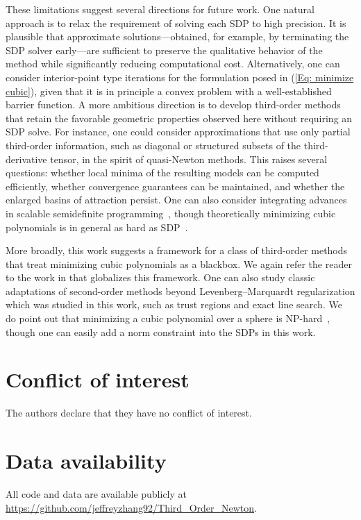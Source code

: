 \documentclass[11pt]{article}
\theoremstyle{plain}
\theoremstyle{definition}
\theoremstyle{remark}
\begin{document}
These limitations suggest several directions for future work. One natural approach is to relax the requirement of solving each SDP to high precision. It is plausible that approximate solutions—obtained, for example, by terminating the SDP solver early—are sufficient to preserve the qualitative behavior of the method while significantly reducing computational cost. Alternatively, one can consider interior-point type iterations for the formulation posed in (\ref{Eq: minimize cubic}), given that it is in principle a convex problem with a well-established barrier function. A more ambitious direction is to develop third-order methods that retain the favorable geometric properties observed here without requiring an SDP solve. For instance, one could consider approximations that use only partial third-order information, such as diagonal or structured subsets of the third-derivative tensor, in the spirit of quasi-Newton methods. This raises several questions: whether local minima of the resulting models can be computed efficiently, whether convergence guarantees can be maintained, and whether the enlarged basins of attraction persist. One can also consider integrating advances in scalable semidefinite programming~\cite{majumdar2020recent}, though theoretically minimizing cubic polynomials is in general as hard as SDP~\cite{ahmadi2022complexity}.

More broadly, this work suggests a framework for a class of third-order methods that treat minimizing cubic polynomials as a blackbox. We again refer the reader to the work in \cite{cai2026globally} that globalizes this framework. One can also study classic adaptations of second-order methods beyond Levenberg–Marquardt regularization which was studied in this work, such as trust regions and exact line search. We do point out that minimizing a cubic polynomial over a sphere is NP-hard~\cite{nesterov2003random}, though one can easily add a norm constraint into the SDPs in this work.
\section*{Conflict of interest}
The authors declare that they have no conflict of interest.

\section*{Data availability}
All code and data are available publicly at \url{https://github.com/jeffreyzhang92/Third_Order_Newton}.
\end{document}
